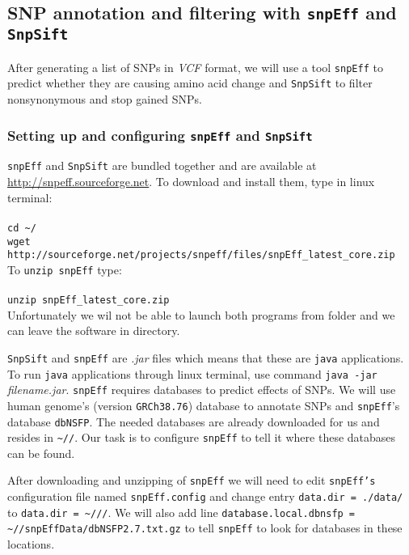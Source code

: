 \subsection{SNP annotation and filtering with \texttt{snpEff} and \texttt{SnpSift}}
After generating a list of SNPs in \textit{VCF} format,
we will use a tool \texttt{snpEff} to predict whether they are causing
amino acid change and \texttt{SnpSift} to filter nonsynonymous and stop gained SNPs.

\subsubsection{Setting up and configuring \texttt{snpEff} and \texttt{SnpSift}}
\texttt{snpEff} and \texttt{SnpSift} are bundled together and are available at \url{http://snpeff.sourceforge.net}.
To download and install them, type in linux terminal:\\~\\
\texttt{cd \textasciitilde/\progDir} \\
\texttt{wget http://sourceforge.net/projects/snpeff/files/snpEff\_latest\_core.zip} \\

To \texttt{unzip snpEff} type:\\~\\
\texttt{unzip snpEff\_latest\_core.zip}\\

Unfortunately we wil not be able to launch both programs from \texttt{\binDir} folder
and we can leave the software in \texttt{\progDir} directory.

\texttt{SnpSift} and \texttt{snpEff} are \textit{.jar} files which means that
these are \texttt{java} applications. To run \texttt{java} applications through linux terminal,
use command \texttt{java -jar} \textit{filename.jar}. 
\texttt{snpEff} requires databases to predict effects of SNPs.
We will use human genome's (version \texttt{GRCh38.76}) database to annotate SNPs
and \texttt{snpEff}'s database \texttt{dbNSFP}.
The needed databases are already downloaded for us and resides in
\texttt{\textasciitilde/\dataDir/\snpEffData}. Our task is to 
configure \texttt{snpEff} to tell it where these databases can be found.

After downloading and unzipping of \texttt{snpEff} we will need to
edit \texttt{snpEff's} configuration file named \texttt{snpEff.config}
and change entry \texttt{data.dir = ./data/} to \texttt{data.dir = \textasciitilde/\dataDir/\snpEffData/}.
We will also add line \texttt{database.local.dbnsfp = \textasciitilde/\dataDir/snpEffData/dbNSFP2.7.txt.gz} to
tell \texttt{snpEff} to look for databases in these locations.

